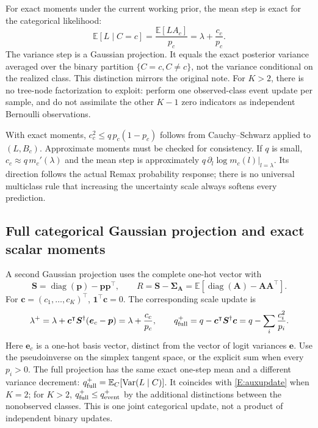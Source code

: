 \documentclass[letterpaper]{article}
\newcommand{\E}{\mathbb E}
\newcommand{\Var}{\operatorname{Var}}
\newcommand{\diag}{\operatorname{diag}}
\newcommand{\given}{\mid}
\begin{document}
For exact moments under the current working prior, the mean step is exact for the categorical likelihood:
\begin{equation}
\E[L\given C=c]=\frac{\E[LA_c]}{p_c}=\lambda+\frac{c_c}{p_c}.
\end{equation}
The variance step is a Gaussian projection. It equals the exact posterior variance averaged over the binary partition $\{C=c,C\ne c\}$, not the variance conditional on the realized class. This distinction mirrors the original note. For $K>2$, there is no tree-node factorization to exploit: perform one observed-class event update per sample, and do not assimilate the other $K-1$ zero indicators as independent Bernoulli observations.

With exact moments, $c_c^2\le q\,p_c(1-p_c)$ follows from Cauchy--Schwarz applied to $(L,B_c)$. Approximate moments must be checked for consistency. If $q$ is small, $c_c\approx q\,m_c'(\lambda)$ and the mean step is approximately $q\,\partial_l\log m_c(l)|_{l=\lambda}$. Its direction follows the actual Remax probability response; there is no universal multiclass rule that increasing the uncertainty scale always softens every prediction.

\subsection{Full categorical Gaussian projection and exact scalar moments}
A second Gaussian projection uses the complete one-hot vector with
\begin{equation}
\bm S=\diag(\bm p)-\bm p\bm p^\intercal,\qquad
R=\bm S-\bm\Sigma_{\bm A}=\E[\diag(\bm A)-\bm A\bm A^\intercal].
\end{equation}
For $\bm c=(c_1,\ldots,c_K)^\intercal$, $\bm 1^\intercal\bm c=0$. The corresponding scale update is
\begin{equation}
\lambda^+=\lambda+\bm c^\intercal\bm S^\dagger(\bm e_c-\bm p)
=\lambda+\frac{c_c}{p_c},\qquad
q^+_{\rm full}=q-\bm c^\intercal\bm S^\dagger\bm c
=q-\sum_i\frac{c_i^2}{p_i}.
\label{E:auxfull}
\end{equation}
Here $\bm e_c$ is a one-hot basis vector, distinct from the vector of logit variances $\bm e$. Use the pseudoinverse on the simplex tangent space, or the explicit sum when every $p_i>0$. The full projection has the same exact one-step mean and a different variance decrement: $q^+_{\rm full}=\E_C[\Var(L\given C)]$. It coincides with \eqref{E:auxupdate} when $K=2$; for $K>2$, $q^+_{\rm full}\le q^+_{\rm event}$ by the additional distinctions between the nonobserved classes. This is one joint categorical update, not a product of independent binary updates.
\end{document}
